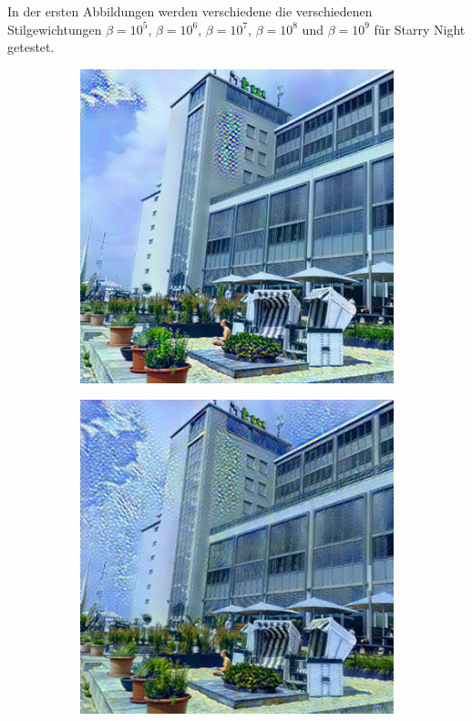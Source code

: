 In der ersten Abbildungen werden verschiedene die verschiedenen  \\
Stilgewichtungen $ \beta = 10^{5} $, $ \beta = 10^{6} $, $ \beta = 10^{7} $, $ \beta = 10^{8} $ und $ \beta = 10^{9} $ für Starry Night getestet.

\begin{figure}[H]
    \centering
    \begin{subfigure}[h]{0.15\textwidth}
        \centering
        \includegraphics[width=\textwidth]{resources/content/experiments/a__starry_night__768x768__style-weight_1e+05__tv-weight_0e+00.jpg}
    \end{subfigure}
    \begin{subfigure}[h]{0.15\textwidth}
        \centering
        \includegraphics[width=\textwidth]{resources/content/experiments/a__starry_night__768x768__style-weight_1e+06__tv-weight_0e+00.jpg}

\end{subfigure}
\end{figure}
